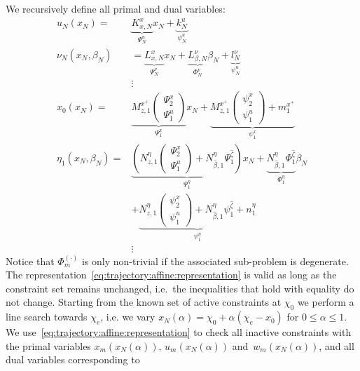 \documentclass{ifacconf}
\begin{document}
We recursively define all primal and dual variables:
\begin{equation}\label{eq:trajectory:affine:representation}
	\begin{split}
		u_N(x_N) =& \underbrace{K_{x,N}^x}_{\Psi_N^u} x_N + \underbrace{k_N^u}_{\psi_N^u}\\
		\nu_N(x_N,\beta_N) &= \underbrace{L_{x,N}^x}_{\Psi_N^\nu} x_N + \underbrace{L_{\beta,N}^\nu}_{\Phi_N^\nu} \beta_N + 
		\underbrace{l_N^\nu}_{\psi_N^u}\\
		&\vdots \\
		x_0(x_N) =& \underbrace{M_{z,1}^{x^+}\left(\begin{array}{c} \Psi_2^x \\ \Psi_1^u \end{array}\right)}_{\Psi_1^x}x_N + 
		\underbrace{M_{z,1}^{x^+}\left(\begin{array}{c} \psi_2^x \\ \psi_1^u \end{array}\right) + m_1^{x^+}}_{\psi^x_1}\\
		\eta_1(x_N,\beta_N) =& \underbrace{\left(N_{z,1}^{\eta}\left(\begin{array}{c} \Psi_2^x \\ \Psi_1^u \end{array}\right) + 
		N_{\hat\beta,1}^\eta \Psi_1^{\hat\zeta}\right)}_{\Psi_1^\eta}x_N + \underbrace{N_{\hat\beta,1}^\eta \Phi_1^{\hat\zeta}}_{\Phi_1^\eta} \beta_N\\
		&+\underbrace{N_{z,1}^{\eta}\left(\begin{array}{c} \psi_2^x \\ \psi_1^u \end{array}\right) + 
		N_{\hat\beta,1}^\eta \psi_1^{\hat\zeta} + n_1^\eta}_{\psi_1^\eta}\\
		&\vdots
	\end{split}
\end{equation}
Notice that $\Phi^{(\cdot)}_m$ is only non-trivial if the associated sub-problem is degenerate. The
representation~\eqref{eq:trajectory:affine:representation} is valid as long as the constraint set remains
unchanged, i.e.\ the inequalities that hold with equality do not change. Starting from the known set of active
constraints at $\chi_0$ we perform a line search towards $\chi_e$, i.e. we vary
$x_N(\alpha)=\chi_0+ \alpha(\chi_e-x_0)$ for $0\leq\alpha\leq1$. We
use~\eqref{eq:trajectory:affine:representation} to check all inactive constraints with the primal variables
$x_m(x_N(\alpha)),\, u_m(x_N(\alpha))$ and~$w_m(x_N(\alpha))$, and all dual variables corresponding to
\end{document}
